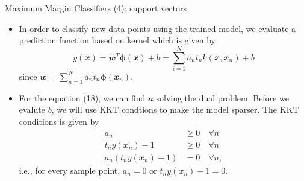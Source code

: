 \documentclass{bredelebeamer}
\begin{document}
\begin{frame}{Maximum Margin Classifiers (4); support vectors}
  \begin{itemize}
    \item In order to classify new data points using the trained model, we
    evaluate a prediction function based on kernel which is given by
    \begin{equation}
      y(\mathbfit{x})
      = \mathbfit{w}^T \boldsymbol{\phi}(\mathbfit{x}) + b
      = \sum_{i=1}^{N} a_n t_n k(\mathbfit{x}, \mathbfit{x}_n) + b
    \end{equation}
    since $\mathbfit{w} = \sum_{n=1}^N a_n t_n \boldsymbol{\phi}(\mathbfit{x}_n)$.
    \item For the equation (18), we can find $\mathbfit{a}$ solving the dual problem.
    Before we evalute $b$, we will use KKT condtions to make the model sparser.
    The KKT conditions is given by
    \begin{equation}
      \begin{split}
        a_n &\geq 0 \quad \forall n \\
        t_n y(\mathbfit{x}_n) - 1 &\geq 0 \quad \forall n \\
        a_n {(t_n y(\mathbfit{x}_n) - 1)} &= 0 \quad \forall n,
      \end{split}
    \end{equation}
    i.e., for every sample point, $a_n = 0$ or $t_n y(\mathbfit{x}_n) - 1 = 0$.
  \end{itemize}
\end{frame}
\end{document}
